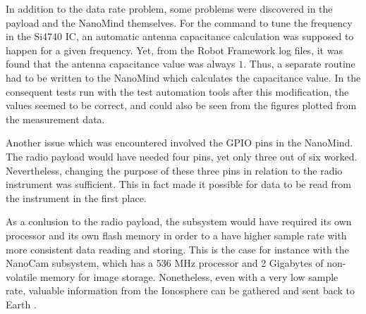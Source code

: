 \documentclass[english,12pt,a4paper,pdftex,elec,utf8]{aaltothesis}
\begin{document}
In addition to the data rate problem, some problems were discovered in the payload and the NanoMind themselves. For the command to tune the frequency in the Si4740 IC, an automatic antenna capacitance calculation was supposed to happen for a given frequency. Yet, from the Robot Framework log files, it was found that the antenna capacitance value was always $1$. Thus, a separate routine had to be written to the NanoMind which calculates the capacitance value. In the consequent tests run with the test automation tools after this modification, the values seemed to be correct, and could also be seen from the figures plotted from the measurement data.\par 
Another issue which was encountered involved the GPIO pins in the NanoMind. The radio payload would have needed four pins, yet only three out of six worked. Nevertheless, changing the purpose of these three pins in relation to the radio instrument was sufficient. This in fact made it possible for data to be read from the instrument in the first place.\par 
As a conlusion to the radio payload, the subsystem would have required its own processor and its own flash memory in order to a have higher sample rate with more consistent data reading and storing. This is the case for instance with the NanoCam subsystem, which has a 536 MHz processor and 2 Gigabytes of non-volatile memory for image storage. Nonetheless, even with a very low sample rate, valuable information from the Ionosphere can be gathered and sent back to Earth \cite{esanpapru}.    
\end{document}
